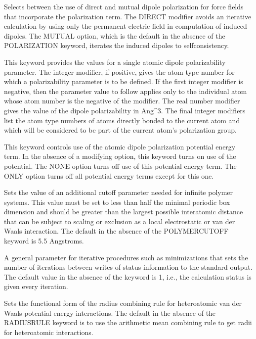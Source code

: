 \documentclass[letterpaper,11pt,english]{sphinxmanual}
\begin{document}
  Selects between the use of direct and mutual dipole polarization for force fields that incorporate the polarization term. The DIRECT modifier avoids an iterative calculation by using only the permanent electric field in computation of induced dipoles. The MUTUAL option, which is the default in the absence of the POLARIZATION keyword, iterates the induced dipoles to self\sphinxhyphen{}consistency.

  This keyword provides the values for a single atomic dipole polarizability parameter. The integer modifier, if positive, gives the atom type number for which a polarizability parameter is to be defined. If the first integer modifier is negative, then the parameter value to follow applies only to the individual atom whose atom number is the negative of the modifier. The real number modifier gives the value of the dipole polarizability in Ang\textasciicircum{}3. The final integer modifiers list the atom type numbers of atoms directly bonded to the current atom and which will be considered to be part of the current atom’s polarization group.

  This keyword controls use of the atomic dipole polarization potential energy term. In the absence of a modifying option, this keyword turns on use of the potential. The NONE option turns off use of this potential energy term. The ONLY option turns off all potential energy terms except for this one.

  Sets the value of an additional cutoff parameter needed for infinite polymer systems. This value must be set to less than half the minimal periodic box dimension and should be greater than the largest possible interatomic distance that can be subject to scaling or exclusion as a local electrostatic or van der Waals interaction. The default in the absence of the POLYMER\sphinxhyphen{}CUTOFF keyword is 5.5 Angstroms.

  A general parameter for iterative procedures such as minimizations that sets the number of iterations between writes of status information to the standard output. The default value in the absence of the keyword is 1, i.e., the calculation status is given every iteration.

  Sets the functional form of the radius combining rule for heteroatomic van der Waals potential energy interactions. The default in the absence of the RADIUSRULE keyword is to use the arithmetic mean combining rule to get radii for heteroatomic interactions.
\end{document}
